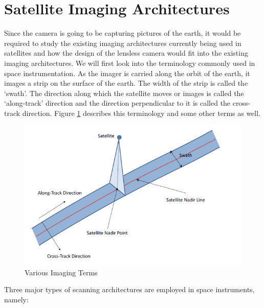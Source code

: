 \section{Satellite Imaging Architectures}
Since the camera is going to be capturing pictures of the earth, it would be required to study the existing imaging architectures currently being used in satellites and how the design of the lensless camera would fit into the existing imaging architectures. We will first look into the terminology commonly used in space instrumentation. As the imager is carried along the orbit of the earth, it images a strip on the surface of the earth. The width of the strip is called the `swath'. The direction along which the satellite moves or images is called the `along-track' direction and the direction perpendicular to it is called the cross-track direction\cite{ImagingGeo}. Figure \ref{fig:ImagingGeo} describes this terminology and some other terms as well.  
\begin{figure}[ht]
\includegraphics[width=\textwidth]{pics/imaginggeo}
\caption{Various Imaging Terms\cite{ImagingGeo}}
\label{fig:ImagingGeo}
\end{figure}
Three major types of scanning architectures are employed in space instruments, namely:
